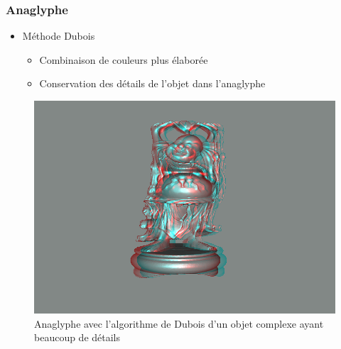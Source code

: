 \documentclass{beamer}
\begin{document}
%
\begin{frame}
\frametitle{Anaglyphe}
\begin{itemize}[label=$\bullet$]
\item Méthode Dubois \cite{algoDubois}
	\begin{itemize}[label=$\circ$]
	\item Combinaison de couleurs plus élaborée
	\item Conservation des détails de l'objet dans l'anaglyphe 
	\end{itemize}
\end{itemize}
\begin{figure}
\centering
\includegraphics[scale=0.3]{happy_dubois.png}
\caption{Anaglyphe avec l'algorithme de Dubois d'un objet complexe ayant beaucoup de détails}
\end{figure}

\end{frame}
\end{document}
